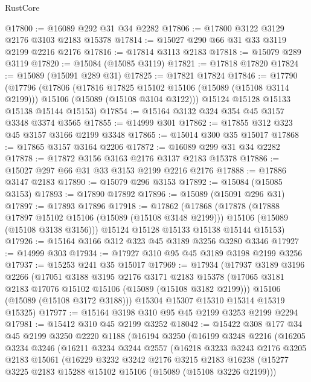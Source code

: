 \begin{lexlean}{RustCore}
\begin{coremodule}
@17800 := @16089 @292 @31 @34 @2282
@17806 := @17800 @3122 @3129 @2176 @3103 @2183 @15378
@17814 := @15027 @290 @66 @31 @33 @3119 @2199 @2216 @2176
@17816 := @17814 @3113 @2183
@17818 := @15079 @289 @3119
@17820 := @15084 (@15085 @3119)
@17821 := @17818 @17820
@17824 := @15089 (@15091 @289 @31)
@17825 := @17821 @17824
@17846 := @17790
    (@17796
      (@17806
        (@17816 @17825 @15102 @15106 (@15089 (@15108 @3114 @2199)))
        @15106
        (@15089 (@15108 @3104 @3122)))
      @15124
      @15128
      @15133
      @15138
      @15144
      @15153)
@17854 := @15164 @3132 @324 @354 @45 @3157 @3348 @3374 @3565
@17855 := @14999 @301
@17862 := @17855 @312 @323 @45 @3157 @3166 @2199 @3348
@17865 := @15014 @300 @35 @15017
@17868 := @17865 @3157 @3164 @2206
@17872 := @16089 @299 @31 @34 @2282
@17878 := @17872 @3156 @3163 @2176 @3137 @2183 @15378
@17886 := @15027 @297 @66 @31 @33 @3153 @2199 @2216 @2176
@17888 := @17886 @3147 @2183
@17890 := @15079 @296 @3153
@17892 := @15084 (@15085 @3153)
@17893 := @17890 @17892
@17896 := @15089 (@15091 @296 @31)
@17897 := @17893 @17896
@17918 := @17862
    (@17868
      (@17878
        (@17888 @17897 @15102 @15106 (@15089 (@15108 @3148 @2199)))
        @15106
        (@15089 (@15108 @3138 @3156)))
      @15124
      @15128
      @15133
      @15138
      @15144
      @15153)
@17926 := @15164 @3166 @312 @323 @45 @3189 @3256 @3280 @3346
@17927 := @14999 @303
@17934 := @17927 @310 @95 @45 @3189 @3198 @2199 @3256
@17937 := @15253 @241 @35 @15017
@17969 := @17934
    (@17937
      @3189
      @3196
      @2266
      (@17051
        @3188
        @3195
        @2176
        @3171
        @2183
        @15378
        (@17065 @3181 @2183 @17076 @15102 @15106 (@15089 (@15108 @3182 @2199)))
        @15106
        (@15089 (@15108 @3172 @3188)))
      @15304
      @15307
      @15310
      @15314
      @15319
      @15325)
@17977 := @15164 @3198 @310 @95 @45 @2199 @3253 @2199 @2294
@17981 := @15412 @310 @45 @2199 @3252
@18042 := @15422
    @308
    @177
    @34
    @45
    @2199
    @3250
    @2220
    @1188
    (@16194
      @3250
      (@16199
        @3248
        @2216
        (@16205
          @3234
          @3246
          (@16211
            @3234
            @3244
            @2557
            (@16218
              @3233
              @3243
              @2176
              @3205
              @2183
              @15061
              (@16229
                @3232
                @3242
                @2176
                @3215
                @2183
                @16238
                (@15277 @3225 @2183 @15288 @15102 @15106 (@15089 (@15108 @3226 @2199)))

\end{coremodule}
\end{lexlean}
